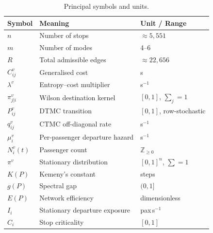 \documentclass[11pt,a4paper]{article}
\theoremstyle{plain}
\theoremstyle{definition}
\theoremstyle{remark}
\begin{document}
\begin{table}[h]
\centering
\caption{Principal symbols and units.}
\begin{tabular}{lll}
\toprule
Symbol & Meaning & Unit / Range \\
\midrule
$n$          & Number of stops               & $\approx5{,}551$ \\
$m$          & Number of modes               & 4--6 \\
$R$          & Total admissible edges        & $\approx22{,}656$ \\
$C^v_{ij}$   & Generalised cost              & s \\
$\lambda^v$  & Entropy--cost multiplier      & s$^{-1}$ \\
$\pi^v_{j|i}$& Wilson destination kernel     & $[0,1]$, $\sum_j=1$ \\
$P^v_{ij}$   & DTMC transition               & $[0,1]$, row-stochastic \\
$q^v_{ij}$   & CTMC off-diagonal rate        & s$^{-1}$ \\
$\mu^v_i$    & Per-passenger departure hazard& s$^{-1}$ \\
$N^v_i(t)$   & Passenger count               & $\mathbb{Z}_{\ge0}$ \\
$\pi^v$      & Stationary distribution       & $[0,1]^n$, $\sum=1$ \\
$K(P)$       & Kemeny's constant             & steps \\
$g(P)$       & Spectral gap                  & $(0,1]$ \\
$E(P)$       & Network efficiency            & dimensionless \\
$I_i$        & Stationary departure exposure & pax\,s$^{-1}$ \\
$C_i$        & Stop criticality              & $[0,1]$ \\
\bottomrule
\end{tabular}
\end{table}
\end{document}
